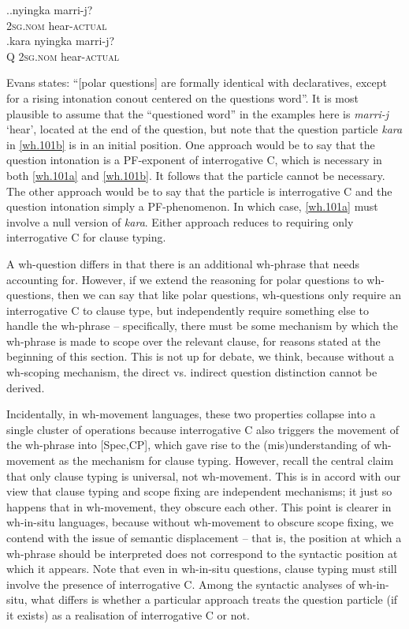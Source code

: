 \documentclass[11pt]{article}
\begin{document}
\ex.\ag.\label{wh.101a}nyingka marri-j?\\
   \textsc{2sg.nom} hear-\textsc{actual}\\
   \bg.\label{wh.101b}kara nyingka marri-j?\\
   Q \textsc{2sg.nom} hear-\textsc{actual}\\
   \hspace{\fill}\citep[364--365]{evans:1995}

Evans states: ``[polar questions] are formally identical with declaratives, except for a rising intonation conout centered on the questions word''. It is most plausible to assume that the ``questioned word'' in the examples here is \textit{marri-j} `hear', located at the end of the question, but note that the question particle \textit{kara} in \ref{wh.101b} is in an initial position. One approach would be to say that the question intonation is a PF-exponent of interrogative C, which is necessary in both \ref{wh.101a} and \ref{wh.101b}. It follows that the particle cannot be necessary. The other approach would be to say that the particle is interrogative C and the question intonation simply a PF-phenomenon. In which case, \ref{wh.101a} must involve a null version of \textit{kara}. Either approach reduces to requiring only interrogative C for clause typing.

A wh-question differs in that there is an additional wh-phrase that needs accounting for. However, if we extend the reasoning for polar questions to wh-questions, then we can say that like polar questions, wh-questions only require an interrogative C to clause type, but independently require something else to handle the wh-phrase -- specifically, there must be some mechanism by which the wh-phrase is made to scope over the relevant clause, for reasons stated at the beginning of this section. This is not up for debate, we think, because without a wh-scoping mechanism, the direct vs. indirect question distinction cannot be derived.

Incidentally, in wh-movement languages, these two properties collapse into a single cluster of operations because interrogative C also triggers the movement of the wh-phrase into [Spec,CP], which gave rise to the (mis)understanding of wh-movement as the mechanism for clause typing. However, recall the central claim that only clause typing is universal, not wh-movement. This is in accord with our view that clause typing and scope fixing are independent mechanisms; it just so happens that in wh-movement, they obscure each other. This point is clearer in wh-in-situ languages, because without wh-movement to obscure scope fixing, we contend with the issue of semantic displacement -- that is, the position at which a wh-phrase should be interpreted does not correspond to the syntactic position at which it appears. Note that even in wh-in-situ questions, clause typing must still involve the presence of interrogative C. Among the syntactic analyses of wh-in-situ, what differs is whether a particular approach treats the question particle (if it exists) as a realisation of interrogative C or not.
\end{document}
